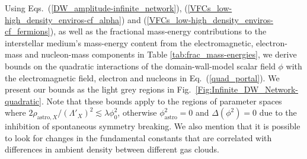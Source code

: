 \documentclass[aps,prd,onecolumn,nofootinbib]{revtex4-2} %
\begin{document}
Using Eqs.~(\ref{DW_amplitude-infinite_network}), (\ref{VFCs_low-high_density_enviros-cf_alpha}) and (\ref{VFCs_low-high_density_enviros-cf_fermions}), as well as the fractional mass-energy contributions to the interstellar medium's mass-energy content from the electromagnetic, electron-mass and nucleon-mass components in Table \ref{tab:frac_mass-energies}, we derive bounds on the quadratic interactions of the domain-wall-model scalar field $\phi$ with the electromagnetic field, electron and nucleons in Eq.~(\ref{quad_portal}). 
We present our bounds as the light grey regions in Fig.~\ref{Fig:Infinite_DW_Network-quadratic}. 
Note that these bounds apply to the regions of parameter spaces where $2 \rho_{\textrm{astro},X} / (\Lambda'_X)^2 \lesssim \lambda \phi_0^2$, otherwise $\phi_\textrm{astro}^2 = 0$ and $\Delta (\phi^2) = 0$ due to the inhibition of spontaneous symmetry breaking. 
We also mention that it is possible to look for changes in the fundamental constants that are correlated with differences in ambient density between different gas clouds. 

\end{document}
